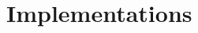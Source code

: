 \documentclass[12pt,a4paper]{scrartcl}		%
\begin{document}
\section{Implementations}


\end{document}
